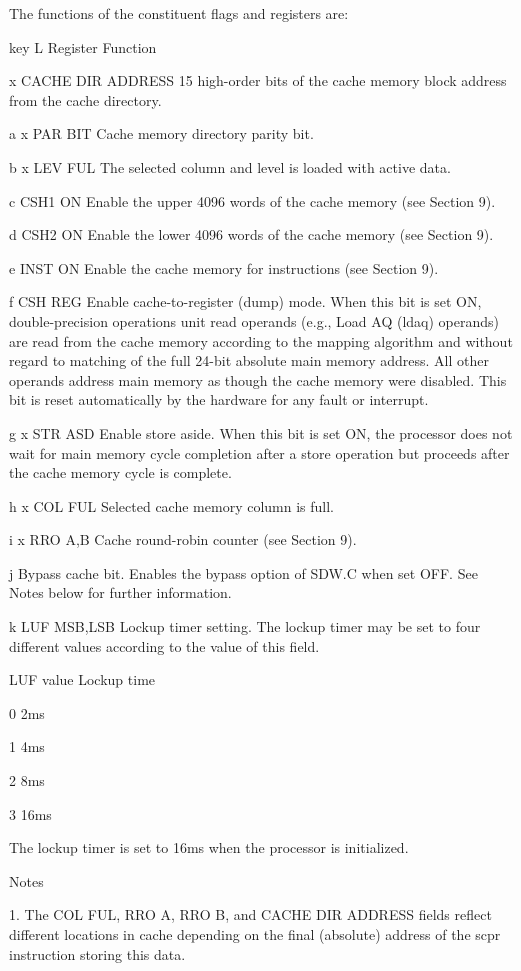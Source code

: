 The functions of the constituent flags and registers are:

key L Register Function

x CACHE DIR ADDRESS 15 high-order bits of the cache memory block address from the cache directory.

a x PAR BIT Cache memory directory parity bit.

b x LEV FUL The selected column and level is loaded with active data.

c CSH1 ON Enable the upper 4096 words of the cache memory (see Section 9).

d CSH2 ON Enable the lower 4096 words of the cache memory (see Section 9).

e INST ON Enable the cache memory for instructions (see Section 9).

f CSH REG Enable cache-to-register (dump) mode. When this bit is set ON,
double-precision operations unit read operands (e.g., Load AQ (ldaq) operands)
are read from the cache memory according to the mapping algorithm and without
regard to matching of the full 24-bit absolute main memory address. All other
operands address main memory as though the cache memory were disabled. This bit
is reset automatically by the hardware for any fault or interrupt.

g x STR ASD Enable store aside. When this bit is set ON, the processor does not wait for main memory cycle completion after a store operation but proceeds after the cache memory cycle is complete.

h x COL FUL Selected cache memory column is full.

i x RRO A,B Cache round-robin counter (see Section 9).

j Bypass cache bit. Enables the bypass option of SDW.C when set OFF. See Notes
below for further information.

k LUF MSB,LSB Lockup timer setting. The lockup timer may be set to four
different values according to the value of this field.

LUF value Lockup time

0 2ms

1 4ms

2 8ms

3 16ms

The lockup timer is set to 16ms when the processor is initialized.

Notes

1. The COL FUL, RRO A, RRO B, and CACHE DIR ADDRESS fields reflect different
locations in cache depending on the final (absolute) address of the scpr
instruction storing this data.

